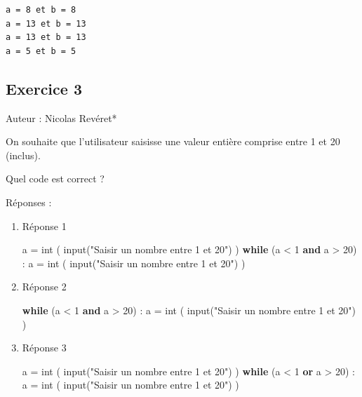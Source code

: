 \documentclass[11pt]{article}
\newenvironment{Shaded}{}{}
\newcommand{\KeywordTok}[1]{\textcolor[rgb]{0.00,0.44,0.13}{\textbf{{#1}}}}
\newcommand{\DecValTok}[1]{\textcolor[rgb]{0.25,0.63,0.44}{{#1}}}
\newcommand{\StringTok}[1]{\textcolor[rgb]{0.25,0.44,0.63}{{#1}}}
\newcommand{\NormalTok}[1]{{#1}}
\newcommand{\ControlFlowTok}[1]{\textcolor[rgb]{0.00,0.44,0.13}{\textbf{{#1}}}}
\newcommand{\OperatorTok}[1]{\textcolor[rgb]{0.40,0.40,0.40}{{#1}}}
\newcommand{\BuiltInTok}[1]{{#1}}
\begin{document}
    \begin{Verbatim}[commandchars=\\\{\}]
a = 8 et b = 8
a = 13 et b = 13
a = 13 et b = 13
a = 5 et b = 5

    \end{Verbatim}

    \hypertarget{exercice-3}{%
\subsection{Exercice 3}\label{exercice-3}}

Auteur : Nicolas Revéret*

On souhaite que l'utilisateur saisisse une valeur entière comprise entre
1 et 20 (inclus).

Quel code est correct ?

Réponses :

\begin{enumerate}
\def\labelenumi{\arabic{enumi}.}
\item
  Réponse 1

\begin{Shaded}
\begin{Highlighting}[]
\NormalTok{a }\OperatorTok{=} \BuiltInTok{int}\NormalTok{ ( }\BuiltInTok{input}\NormalTok{(}\StringTok{"Saisir un nombre entre 1 et 20"}\NormalTok{) )}
\ControlFlowTok{while}\NormalTok{ (a }\OperatorTok{<} \DecValTok{1} \KeywordTok{and}\NormalTok{ a }\OperatorTok{>} \DecValTok{20}\NormalTok{) :}
\NormalTok{      a }\OperatorTok{=} \BuiltInTok{int}\NormalTok{ ( }\BuiltInTok{input}\NormalTok{(}\StringTok{"Saisir un nombre entre 1 et 20"}\NormalTok{) )}
\end{Highlighting}
\end{Shaded}
\item
  Réponse 2

\begin{Shaded}
\begin{Highlighting}[]
\ControlFlowTok{while}\NormalTok{ (a }\OperatorTok{<} \DecValTok{1} \KeywordTok{and}\NormalTok{ a }\OperatorTok{>} \DecValTok{20}\NormalTok{) :}
\NormalTok{    a }\OperatorTok{=} \BuiltInTok{int}\NormalTok{ ( }\BuiltInTok{input}\NormalTok{(}\StringTok{"Saisir un nombre entre 1 et 20"}\NormalTok{) )}
\end{Highlighting}
\end{Shaded}
\item
  Réponse 3

\begin{Shaded}
\begin{Highlighting}[]
\NormalTok{a }\OperatorTok{=} \BuiltInTok{int}\NormalTok{ ( }\BuiltInTok{input}\NormalTok{(}\StringTok{"Saisir un nombre entre 1 et 20"}\NormalTok{) )}
\ControlFlowTok{while}\NormalTok{ (a }\OperatorTok{<} \DecValTok{1} \KeywordTok{or}\NormalTok{ a }\OperatorTok{>} \DecValTok{20}\NormalTok{) :}
\NormalTok{    a }\OperatorTok{=} \BuiltInTok{int}\NormalTok{ ( }\BuiltInTok{input}\NormalTok{(}\StringTok{"Saisir un nombre entre 1 et 20"}\NormalTok{) )}
\end{Highlighting}
\end{Shaded}
\end{enumerate}
\end{document}
